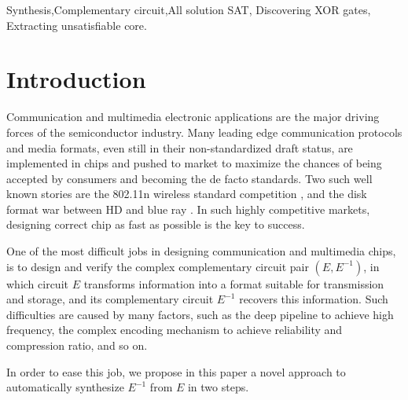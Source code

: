 \documentclass[journal]{IEEEtran}
\begin{document}
\begin{IEEEkeywords}
Synthesis,Complementary circuit,All solution SAT, Discovering XOR gates, Extracting unsatisfiable core.
\end{IEEEkeywords}






%
\IEEEpeerreviewmaketitle


\newtheorem{algo}{Algorithm}
\newtheorem{definition11}{Definition}
\newtheorem{theorem}{Theorem}

\section{Introduction}
Communication and multimedia electronic applications are the major driving forces of the semiconductor industry.
Many leading edge communication protocols and media formats,
even still in their non-standardized draft status,
are implemented in chips and pushed to market
to maximize the chances of being accepted by consumers and becoming the de facto standards.
Two such well known stories are the 802.11n wireless standard competition \cite{IEEE80211N},
and the disk format war between HD and blue ray \cite{BRHDVD}.
In such highly competitive markets,
designing correct chip as fast as possible is the key to success.

One of the most difficult jobs in designing communication and multimedia chips,
is to design and verify the complex complementary circuit pair $(E,E^{-1})$,
in which circuit $E$ transforms information into a format suitable for transmission and storage,
and its complementary circuit $E^{-1}$ recovers this information.
Such difficulties are caused by many factors,
such as the deep pipeline to achieve high frequency,
the complex encoding mechanism to achieve reliability and compression ratio,
and so on.

In order to ease this job,
we propose in this paper a novel approach to automatically synthesize $E^{-1}$ from $E$ in two steps.
\end{document}
